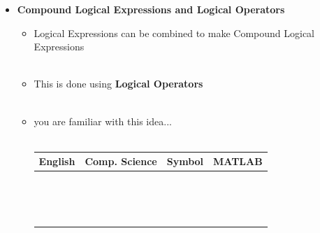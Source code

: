 \documentclass[11pt]{article}
\newcommand{\BR}{\color{mybrown}}
\newcommand{\G}{\color{mygreen}}
\begin{document}
\begin{itemize}
\begin{itemize}
						  \\\\
						  \\\\
						  \\
				\end{itemize}
				\newpage
					\item \textbf{ {\BR Compound Logical Expressions} and {\G Logical Operators}} \\
			\begin{itemize}
				\item Logical Expressions can be combined to make Compound Logical Expressions\\\\
				
				\item This is done using {\bf{\G Logical Operators}}\\\\

				\item you are familiar with this idea...\\\\
				
				
					\LARGE
					\begin{center}
					\begin{tabular}{|| m{4cm} | m{5cm}| m{2.5cm} |m{3cm} || } \hline
						 {\bf English} &{\bf Comp. Science} & {\bf Symbol} & {\bf MATLAB} \\ \hline \hline
 						 &  &  & \\   
 						 &  &  & \\
 						 &  &  & \\
 						 &  &  & \\
 						 &  &  & \\\hline
 						 &  &  & \\
 						 &  &  & \\
 						 &  &  & \\
 						 &  &  & \\
 						 &  &  & \\\hline
 						 &  &  & \\
 						 &  &  & \\
 						 &  &  & \\
 						 &  &  & \\
 						 &  &  & \\ \hline
 						   

\end{tabular}
\end{center}
\end{itemize}
\end{itemize}
\end{document}
